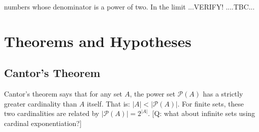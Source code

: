 numbers whose denominator is a power of two. In the limit  ...VERIFY! ....TBC...












\section{Theorems and Hypotheses}

\subsection{Cantor's Theorem}
Cantor's theorem says that for any set $A$, the power set $\mathcal{P}(A)$ has a strictly greater cardinality than $A$ itself. That is: $|A| < |\mathcal{P}(A)|$. For finite sets, these two cardinalities are related by $|\mathcal{P}(A)| = 2^{|A|}$. [Q: what about infinite sets using cardinal exponentiation?]

